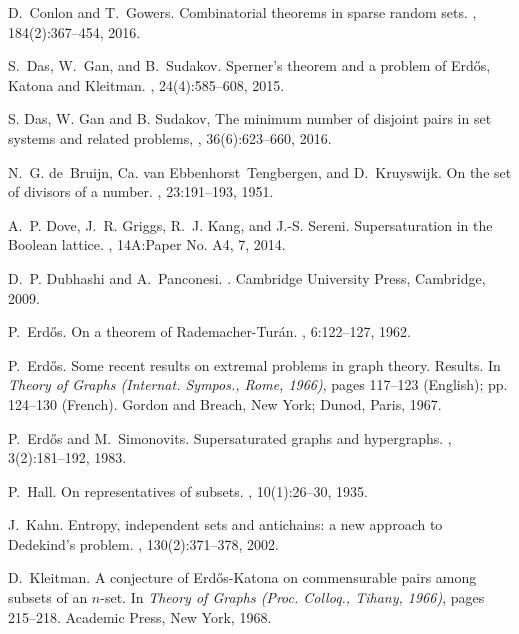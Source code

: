 \documentclass[11 pt]{article}
\theoremstyle{definition}
\theoremstyle{case}
\numberwithin{equation}{section}
\begin{document}
\begin{thebibliography}{10}
D.~Conlon and T.~Gowers.
\newblock Combinatorial theorems in sparse random sets.
, 184(2):367--454, 2016.

S.~Das, W.~Gan, and B.~Sudakov.
\newblock Sperner's theorem and a problem of {E}rd{\H o}s, {K}atona and
  {K}leitman.
, 24(4):585--608, 2015.

S. Das, W. Gan and B. Sudakov, 
\newblock The minimum number of disjoint pairs in set systems and related problems, 
, 36(6):623--660, 2016. 

N.~G. de~Bruijn, Ca. van Ebbenhorst~Tengbergen, and D.~Kruyswijk.
\newblock On the set of divisors of a number.
, 23:191--193, 1951.

A.~P. Dove, J.~R. Griggs, R.~J. Kang, and J.-S. Sereni.
\newblock Supersaturation in the {B}oolean lattice.
, 14A:Paper No. A4, 7, 2014.

D.~P. Dubhashi and A.~Panconesi.
.
\newblock Cambridge University Press, Cambridge, 2009.

P.~Erd{\H{o}}s.
\newblock On a theorem of {R}ademacher-{T}ur\'an.
, 6:122--127, 1962.

P.~Erd{\H{o}}s.
\newblock Some recent results on extremal problems in graph theory. {R}esults.
\newblock In {\em Theory of {G}raphs ({I}nternat. {S}ympos., {R}ome, 1966)},
  pages 117--123 (English); pp. 124--130 (French). Gordon and Breach, New York;
  Dunod, Paris, 1967.

P.~Erd{\H{o}}s and M.~Simonovits.
\newblock Supersaturated graphs and hypergraphs.
, 3(2):181--192, 1983.

P.~Hall.
\newblock On representatives of subsets.
, 10(1):26--30, 1935.

J.~Kahn.
\newblock Entropy, independent sets and antichains: a new approach to
  {D}edekind's problem.
, 130(2):371--378, 2002.

D.~Kleitman.
\newblock A conjecture of {E}rd{\H o}s-{K}atona on commensurable pairs among
  subsets of an {$n$}-set.
\newblock In {\em Theory of {G}raphs ({P}roc. {C}olloq., {T}ihany, 1966)},
  pages 215--218. Academic Press, New York, 1968.


\end{thebibliography}
\end{document}
